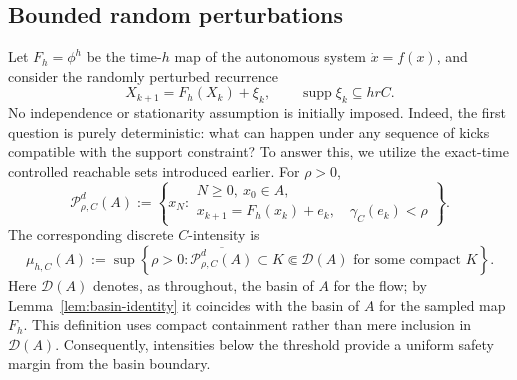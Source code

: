 \documentclass[pdflatex,sn-mathphys-num]{sn-jnl}
\numberwithin{equation}{section}
\theoremstyle{thmstyleone}%
\theoremstyle{definition}
\theoremstyle{remark}
\begin{document}
\subsection{Bounded random perturbations}
\label{subsec:bounded-random-perturbations}

Let $F_h=\phi^h$ be the time-$h$ map of the autonomous system $\dot x=f(x)$, and consider the randomly perturbed recurrence 
\begin{equation}
    X_{k+1}=F_h(X_k)+\xi_k,
    \qquad
    \operatorname{supp}\xi_k\subseteq hrC .
    \label{eq:bounded-random-recurrence}
\end{equation}
No independence or stationarity assumption is initially imposed. Indeed, the first question is purely deterministic: what can happen under any sequence of kicks compatible with the support constraint? To answer this, we utilize the exact-time controlled reachable sets introduced earlier. For $\rho>0$, $$
\mathcal P^d_{\rho,C}(A) := \left\{
        x_N:
        \begin{array}{l}
        N\geq0,\ x_0\in A,\\
        x_{k+1}=F_h(x_k)+e_k,\quad
        \gamma_C(e_k)<\rho
        \end{array}
    \right\}.
$$
The corresponding discrete $C$-intensity is
$$
    \mu_{h,C}(A)
    :=
    \sup\left\{
        \rho>0:
        \overline{\mathcal P^d_{\rho,C}(A)}
        \subset K\Subset\mathcal D(A)
        \text{ for some compact }K
    \right\}.
$$
Here $\mathcal D(A)$ denotes, as throughout, the basin of $A$ for the flow; by Lemma~\ref{lem:basin-identity} it coincides with the basin of $A$ for the sampled map $F_h$. This definition uses compact containment rather than mere inclusion in $\mathcal D(A)$. Consequently, intensities below the threshold provide a uniform safety margin from the basin boundary.
\end{document}
